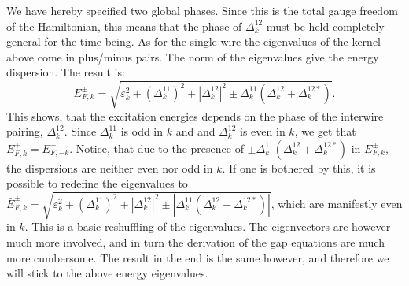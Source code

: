 We have hereby specified two global phases. Since this is the total gauge freedom of the Hamiltonian, this means that the phase of $\Delta^{12}_k$ must be held completely general for the time being. As for the single wire the eigenvalues of the kernel above come in plus/minus pairs. The norm of the eigenvalues give the energy dispersion. The result is:
\begin{equation}
E^{\pm}_{F,k} = \sqrt{\varepsilon^2_k + \left(\Delta^{11}_k\right)^2 + \left|\Delta^{12}_k\right|^2 \pm \Delta^{11}_k(\Delta^{12}_k + \Delta^{12*}_k)}. 
\end{equation} 
This shows, that the excitation energies depends on the phase of the interwire pairing, $\Delta^{12}_k$. Since $\Delta^{11}_k$ is odd in $k$ and and $\Delta^{12}_k$ is even in $k$, we get that $E^{+}_{F,k} = E^{-}_{F,-k}$. Notice, that due to the presence of $\pm \Delta^{11}_k(\Delta^{12}_k + \Delta^{12*}_k)$ in $E^{\pm}_{F,k}$, the dispersions are neither even nor odd in $k$. If one is bothered by this, it is possible to redefine the eigenvalues to $\bar{E}^{\pm}_{F,k} = \sqrt{\varepsilon^2_k + \left(\Delta^{11}_k\right)^2 + \left|\Delta^{12}_k\right|^2 \pm |\Delta^{11}_k(\Delta^{12}_k + \Delta^{12*}_k)|}$, which are manifestly even in $k$. This is a basic reshuffling of the eigenvalues. The eigenvectors are however much more involved, and in turn the derivation of the gap equations are much more cumbersome. The result in the end is the same however, and therefore we will stick to the above energy eigenvalues.  

